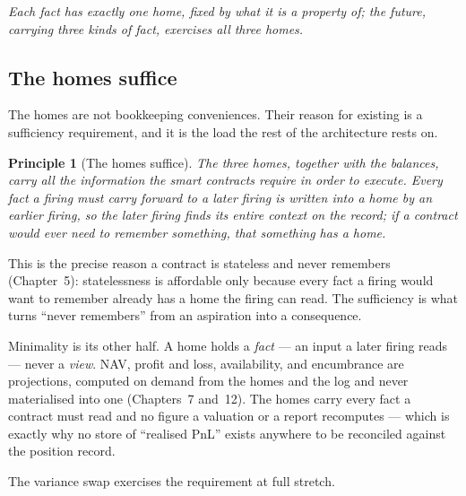 \documentclass[11pt,a4paper]{article}
\newtheorem{principle}[definition]{Principle}
\begin{document}
\emph{Each fact has exactly one home, fixed by what it is a property of; the future,
carrying three kinds of fact, exercises all three homes.}

\subsection{The homes suffice}

The homes are not bookkeeping conveniences. Their reason for existing is a sufficiency
requirement, and it is the load the rest of the architecture rests on.

\begin{principle}[The homes suffice]\label{prin:sufficiency}
The three homes, together with the balances, carry all the information the smart contracts
require in order to execute. Every fact a firing must carry forward to a later firing is
written into a home by an earlier firing, so the later firing finds its entire context on
the record; if a contract would ever need to remember something, that something has a
home.
\end{principle}

This is the precise reason a contract is stateless and never remembers
(Chapter~5): statelessness is affordable only because every fact a firing
would want to remember already has a home the firing can read. The sufficiency is what
turns ``never remembers'' from an aspiration into a consequence.

Minimality is its other half. A home holds a \emph{fact} --- an input a later firing reads
--- never a \emph{view}. NAV, profit and loss, availability, and encumbrance are
projections, computed on demand from the homes and the log and never materialised into one
(Chapters~7 and~12). The homes carry every fact a contract
must read and no figure a valuation or a report recomputes --- which is exactly why no
store of ``realised PnL'' exists anywhere to be reconciled against the position record.

The variance swap exercises the requirement at full stretch.
\end{document}
